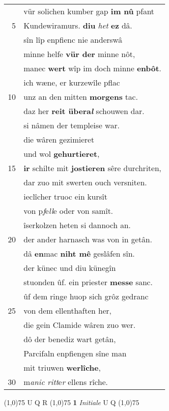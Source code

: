 \documentclass[8pt,a4paper,notitlepage]{article}
\begin{document}
\begin{table}[ht]
\begin{minipage}[t]{0.5\linewidth}
\begin{tabular}{rl}
 & vür solichen kumber gap \textbf{im nû} pfant\\ 
5 & Kundewiramurs. \textbf{diu} \textit{het} \textbf{ez} dâ.\\ 
 & sîn lîp enpfienc nie anderswâ\\ 
 & minne helfe \textbf{vür der} minne nôt,\\ 
 & manec \textbf{wert} wîp im doch minne \textbf{enbôt}.\\ 
 & ich wæne, er kurzewîle pflac\\ 
10 & unz an den mitten \textbf{morgens} tac.\\ 
 & daz her \textbf{reit übera\textit{l}} schouwen dar.\\ 
 & si nâmen der templeise war.\\ 
 & die wâren gezimieret\\ 
 & und wol \textbf{gehurtieret},\\ 
15 & \textbf{ir} schilte mit \textbf{jostieren} sêre durchriten,\\ 
 & dar zuo mit swerten ouch versniten.\\ 
 & ieclîcher truoc ein kursît\\ 
 & von p\textit{f}e\textit{ll}e oder von samît.\\ 
 & îserkolzen heten si dannoch an.\\ 
20 & der ander harnasch was von in getân.\\ 
 & dâ \textbf{en}mac \textbf{niht mê} geslâfen sîn.\\ 
 & der künec und diu künegîn\\ 
 & stuonden ûf. ein priester \textbf{messe} sanc.\\ 
 & ûf dem ringe huop sich grôz gedranc\\ 
25 & von dem ellenthaften her,\\ 
 & die gein Clamide wâren zuo wer.\\ 
 & dô der benediz wart getân,\\ 
 & Parcifaln enpfiengen sîne man\\ 
 & mit triuwen \textbf{werlîche},\\ 
30 & m\textit{anic ritt}e\textit{r} ellens rîche.\\ 
\end{tabular}
\scriptsize
\line(1,0){75} \newline
U Q R \newline
\line(1,0){75} \newline
\textbf{1} \textit{Initiale} U Q  \newline
\line(1,0){75} \newline

\end{minipage}
\end{table}
\end{document}
